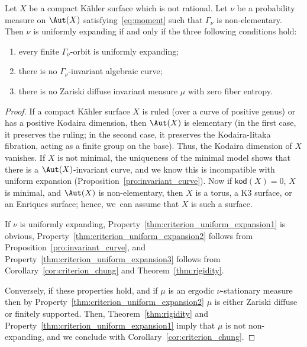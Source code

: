 \begin{thm}\label{thm:criterion_uniform_expansion}
Let $X$ be a compact Kähler surface which is not rational. Let $\nu$ be a probability measure on
$\Aut(X)$ satisfying~\eqref{eq:moment} such that $\Gamma_\nu$ is non-elementary.
Then $\nu$ is uniformly expanding if and only if the three following conditions
hold:
\begin{enumerate}
\item\label{thm:criterion_uniform_expansion1} every finite $\Gamma_\nu$-orbit is uniformly expanding;
\item\label{thm:criterion_uniform_expansion2} there is no $\Gamma_\nu$-invariant algebraic curve;
\item\label{thm:criterion_uniform_expansion3} there is no Zariski diffuse invariant measure $\mu$ with zero fiber entropy.
\end{enumerate}
\end{thm}

\begin{proof} If a compact Kähler surface $X$ is ruled (over a curve of positive genus) or has a positive Kodaira dimension, then $\Aut(X)$ is elementary (in the first case, it preserves the ruling; in the second case, it preserves the Kodaira-Iitaka fibration, acting as a finite group on the base). Thus, the Kodaira dimension of $X$ vanishes. If $X$ is not minimal, the uniqueness of the minimal model shows that there is a $\Aut(X)$-invariant curve, and we know this is incompatible with uniform expansion (Proposition~\ref{pro:invariant_curve}). Now if ${\mathsf{kod}}(X)=0$, $X$ is minimal, and $\Aut(X)$ is non-elementary, then $X$ is a torus, a K3 surface, or an Enriques surface; hence, we~can assume that $X$ is such a surface.

If $\nu$ is uniformly expanding, Property~\eqref{thm:criterion_uniform_expansion1} is obvious, Property~\eqref{thm:criterion_uniform_expansion2} follows from Proposition~\ref{pro:invariant_curve}, and
Property~\eqref{thm:criterion_uniform_expansion3} follows from Corollary~\ref{cor:criterion_chung} and Theorem~\ref{thm:rigidity}.

Conversely, if these properties hold, and if $\mu$ is an ergodic $\nu$-stationary measure then by Property~\eqref{thm:criterion_uniform_expansion2}
$\mu$ is either Zariski diffuse or finitely supported. Then, Theorem~\ref{thm:rigidity} and Property~\eqref{thm:criterion_uniform_expansion1} imply that $\mu$ is not non-expanding, and we conclude with Corollary~\ref{cor:criterion_chung}.
\end{proof}

